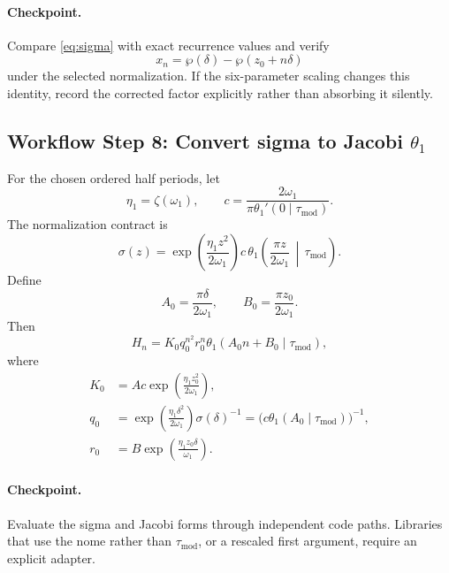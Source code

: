 \documentclass[11pt]{article}
\newcommand{\workflowstep}[1]{\subsection{Workflow Step #1}}
\newcommand{\taumod}{\tau_{\mathrm{mod}}}
\begin{document}
\paragraph{Checkpoint.}
Compare \cref{eq:sigma} with exact recurrence values and verify
\begin{equation}
 x_n=\wp(\delta)-\wp(z_0+n\delta)
 \label{eq:x-sigma}
\end{equation}
under the selected normalization.  If the six-parameter scaling changes this
identity, record the corrected factor explicitly rather than absorbing it
silently.

\workflowstep{8: Convert sigma to Jacobi $\theta_1$}
For the chosen ordered half periods, let
\[
 \eta_1=\zeta(\omega_1),\qquad
 c=\frac{2\omega_1}{\pi\theta_1'(0\mid\taumod)}.
\]
The normalization contract is
\begin{equation}
 \sigma(z)=
 \exp\!\left(\frac{\eta_1z^2}{2\omega_1}\right)c\,
 \theta_1\!\left(\frac{\pi z}{2\omega_1}\,\middle|\,\taumod\right).
 \label{eq:sigma-theta}
\end{equation}
Define
\begin{equation}
 A_0=\frac{\pi\delta}{2\omega_1},\qquad
 B_0=\frac{\pi z_0}{2\omega_1}.
 \label{eq:A0B0}
\end{equation}
Then
\begin{equation}
 H_n=K_0q_0^{n^2}r_0^n
 \theta_1(A_0n+B_0\mid\taumod),
 \label{eq:theta}
\end{equation}
where
\begin{align}
 K_0&=Ac\exp\!\left(\frac{\eta_1z_0^2}{2\omega_1}\right),\\
 q_0&=\exp\!\left(\frac{\eta_1\delta^2}{2\omega_1}\right)
       \sigma(\delta)^{-1}
     =\bigl(c\theta_1(A_0\mid\taumod)\bigr)^{-1},\\
 r_0&=B\exp\!\left(\frac{\eta_1z_0\delta}{\omega_1}\right).
 \label{eq:theta-constants}
\end{align}

\paragraph{Checkpoint.}
Evaluate the sigma and Jacobi forms through independent code paths.  Libraries
that use the nome rather than $\taumod$, or a rescaled first argument, require
an explicit adapter.
\end{document}
